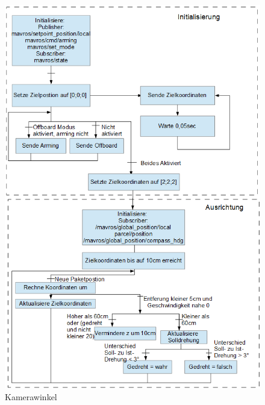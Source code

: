 \begin{figure}[h]
	\centering
	\includegraphics[scale=0.85]{"Grafiken/Prozellablauf.png"}
	\caption{Kamerawinkel}
	\label{fig:meine-grafik}
\end{figure}